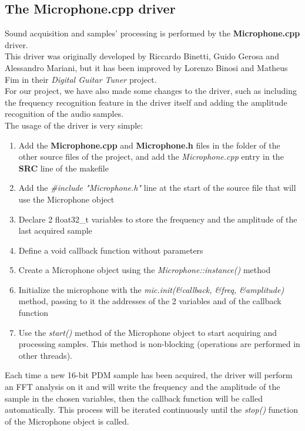 \subsection{The Microphone.cpp driver}
Sound acquisition and samples' processing is performed by the \textbf{Microphone.cpp} driver. \\
This driver was originally developed by Riccardo Binetti, Guido Gerosa and Alessandro Mariani, but it has been improved by Lorenzo Binosi and Matheus Fim in their \textit{Digital Guitar Tuner} project. \\
For our project, we have also made some changes to the driver, such as including the frequency recognition feature in the driver itself and adding the amplitude recognition of the audio samples. \\
The usage of the driver is very simple:
\begin{enumerate}
	\item Add the \textbf{Microphone.cpp} and \textbf{Microphone.h} files in the folder of the other source files of the project, and add the \textit{Microphone.cpp} entry in the \textbf{SRC} line of the makefile
	\item Add the \textit{\#include "Microphone.h"} line at the start of the source file that will use the Microphone object
	\item Declare 2 float32\_t variables to store the frequency and the amplitude of the last acquired sample
	\item Define a void callback function without parameters
	\item Create a Microphone object using the \textit{Microphone::instance()} method
	\item Initialize the microphone with the \textit{mic.init(\&callback, \&freq, \&amplitude)} method, passing to it the addresses of the 2 variables and of the callback function
	\item Use the \textit{start()} method of the Microphone object to start acquiring and processing samples. This method is non-blocking (operations are performed in other threads).
\end{enumerate}
Each time a new 16-bit PDM sample has been acquired, the driver will perform an FFT analysis on it and will write the frequency and the amplitude of the sample in the chosen variables, then the callback function will be called automatically. This process will be iterated continuously until the \textit{stop()} function of the Microphone object is called.